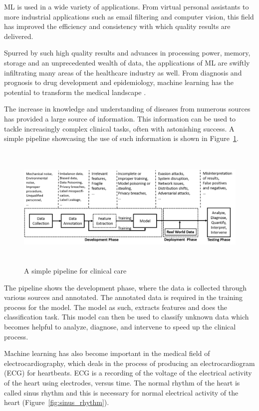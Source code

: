 ML is used in a wide variety of applications. From virtual personal assistants to more industrial applications such as email filtering and computer vision, this field has improved the efficiency and consistency with which quality results are delivered.

Spurred by such high quality results and advances in processing power, memory, storage and an unprecedented wealth of data, the applications of ML are swiftly infiltrating many areas of the healthcare industry as well. From diagnosis and prognosis to drug development and epidemiology, machine learning has the potential to transform the medical landscape \cite{deo2015machine} \cite{beaulieu2019trends}. 

The increase in knowledge and understanding of diseases from numerous sources has provided a large source of information. This information can be used to tackle increasingly complex clinical tasks, often with astonishing success. A simple pipeline showcasing the use of such information is shown in Figure~\ref{fig:pipeline_clinical_care}. 

\begin{figure}[ht]
    \centering
    \includegraphics[width=1.0\linewidth, height=6cm]{BachelorMasterThesis/Introduction/Figures/ml_pipeline_medicine.png}
    \caption{A simple pipeline for clinical care \cite{qayyum2020secure}}
    \label{fig:pipeline_clinical_care}
\end{figure}

The pipeline shows the development phase, where the data is collected through various sources and annotated. The annotated data is required in the training process for the model. The model as such, extracts features and does the classification task. This model can then be used to classify unknown data which becomes helpful to analyze, diagnose, and intervene to speed up the clinical process.

Machine learning has also become important in the medical field of electrocardiography, which deals in the process of producing an electrocardiogram (ECG) for heartbeats. ECG is a recording of the voltage of the electrical activity of the heart using electrodes, versus time. The normal rhythm of the heart is called sinus rhythm and this is necessary for normal electrical activity of the heart (Figure~\ref{fig:sinus_rhythm}). 

